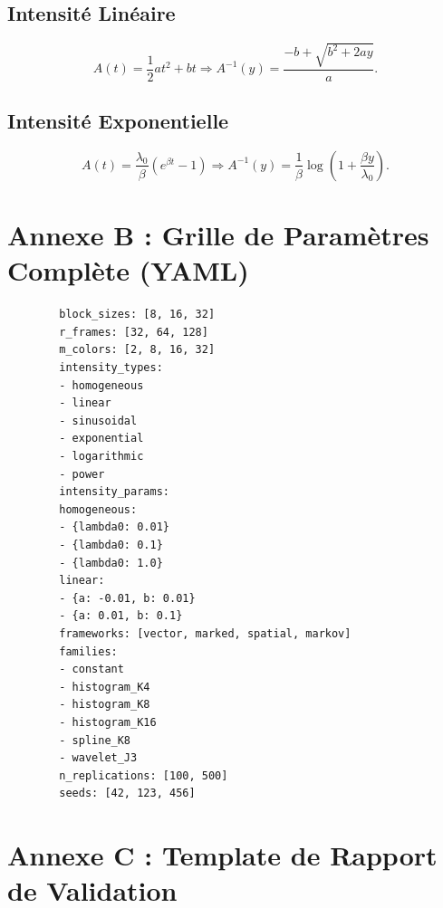 \documentclass[12pt,a4paper]{article}
\begin{document}
	\subsection{Intensité Linéaire}
	\begin{equation}
		A(t) = \frac{1}{2} a t^2 + b t \Rightarrow A^{-1}(y) = \frac{-b + \sqrt{b^2 + 2ay}}{a}.
	\end{equation}
	
	\subsection{Intensité Exponentielle}
	\begin{equation}
		A(t) = \frac{\lambda_0}{\beta} (e^{\beta t} - 1) \Rightarrow A^{-1}(y) = \frac{1}{\beta} \log\left(1 + \frac{\beta y}{\lambda_0}\right).
	\end{equation}
	
	\section{Annexe B : Grille de Paramètres Complète (YAML)}
	\label{annexe:yaml}
	
	\begin{verbatim}
		block_sizes: [8, 16, 32]
		r_frames: [32, 64, 128]
		m_colors: [2, 8, 16, 32]
		intensity_types:
		- homogeneous
		- linear
		- sinusoidal
		- exponential
		- logarithmic
		- power
		intensity_params:
		homogeneous:
		- {lambda0: 0.01}
		- {lambda0: 0.1}
		- {lambda0: 1.0}
		linear:
		- {a: -0.01, b: 0.01}
		- {a: 0.01, b: 0.1}
		frameworks: [vector, marked, spatial, markov]
		families: 
		- constant
		- histogram_K4
		- histogram_K8
		- histogram_K16
		- spline_K8
		- wavelet_J3
		n_replications: [100, 500]
		seeds: [42, 123, 456]
	\end{verbatim}
	
	\section{Annexe C : Template de Rapport de Validation}
	\label{annexe:rapport}
	
\end{document}
